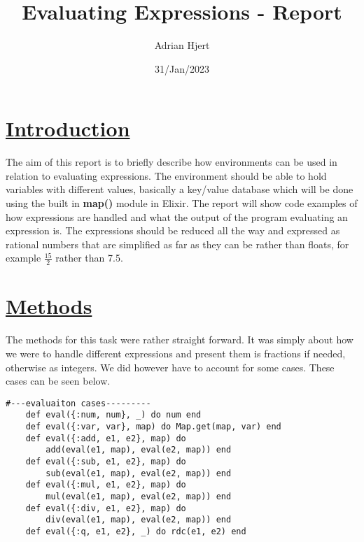 \documentclass[a4paper,11pt]{article}
\begin{document}
 \title{
 	\textbf{Evaluating Expressions - Report}
}

\author{Adrian Hjert}
\date{31/Jan/2023}

\maketitle

\section*{
	\underline{Introduction}
}

The aim of this report is to briefly describe how environments can be used in relation to evaluating expressions. The environment should be able to hold variables with different values, basically a key/value database which will be done using the built in \textbf{map()} module in Elixir. The report will show code examples of how expressions are handled and what the output of the program evaluating an expression is. The expressions should be reduced all the way and expressed as rational numbers that are simplified as far as they can be rather than floats, for example $\frac{15}{2}$ rather than 7.5.

\section*{
	\underline{Methods}
}
The methods for this task were rather straight forward. It was simply about how we were to handle different expressions and present them is fractions if needed, otherwise as integers. We did however have to account for some cases. These cases can be seen below.

\begin{verbatim}
#---evaluaiton cases---------
    def eval({:num, num}, _) do num end
    def eval({:var, var}, map) do Map.get(map, var) end
    def eval({:add, e1, e2}, map) do 
    	add(eval(e1, map), eval(e2, map)) end
    def eval({:sub, e1, e2}, map) do 
    	sub(eval(e1, map), eval(e2, map)) end
    def eval({:mul, e1, e2}, map) do 
    	mul(eval(e1, map), eval(e2, map)) end
    def eval({:div, e1, e2}, map) do 
    	div(eval(e1, map), eval(e2, map)) end
    def eval({:q, e1, e2}, _) do rdc(e1, e2) end
\end{verbatim}
\end{document}
